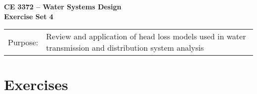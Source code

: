 \documentclass[12pt]{article}
\begin{document}
\begin{center}
{\textbf{{ CE 3372 -- Water Systems Design} \\ {Exercise Set 4}}}
\end{center}
\begingroup
\begin{tabular}{p{1in} p{5in}}
Purpose: & Review and application of head loss models used in water transmission and distribution system analysis\\


\end{tabular}
\endgroup
\section*{\small{Exercises}}
\begin{enumerate}


\end{enumerate}
\end{document}
